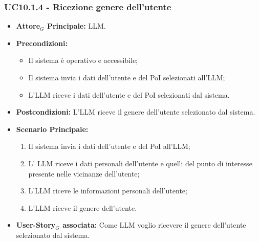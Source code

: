 \documentclass[11pt]{article}
\begin{document}
\begin{justify}
\subsubsection{\textbf{UC10.1.4 - Ricezione genere dell'utente}}
\begin{itemize}
    \item \textbf{Attore$_G$ Principale:} LLM.
    \item \textbf{Precondizioni:} 
        \begin{itemize}
          \item Il sistema è operativo e accessibile;
          \item Il sistema invia i dati dell'utente e del PoI selezionati all'LLM;
            \item L'LLM riceve i dati dell'utente e del PoI selezionati dal sistema.
        \end{itemize}
      \item \textbf{Postcondizioni:} L'LLM riceve il genere dell'utente selezionato dal sistema.
    \item \textbf{Scenario Principale:} 
        \begin{enumerate}
          \item Il sistema invia i dati dell'utente e del PoI all'LLM;
        \item L' LLM riceve i dati personali dell'utente e quelli del punto di interesse presente nelle vicinanze dell'utente;
          \item L'LLM riceve le informazioni personali dell'utente;
          \item L'LLM riceve il genere dell'utente.
        \end{enumerate}
      \item \textbf{User-Story$_G$ associata:} Come LLM voglio ricevere il genere dell'utente selezionato dal sistema.
\end{itemize}

\end{justify}
\end{document}

